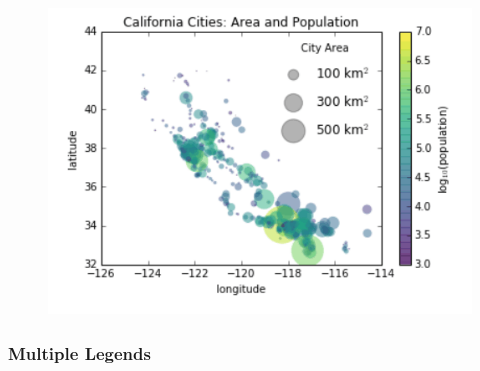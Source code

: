 \documentclass[]{book}
\begin{document}
\begin{figure}
\centering
\includegraphics{images/legend4.png}
\caption{}
\end{figure}

\subsubsection{Multiple Legends}\label{multiple-legends}
\end{document}
